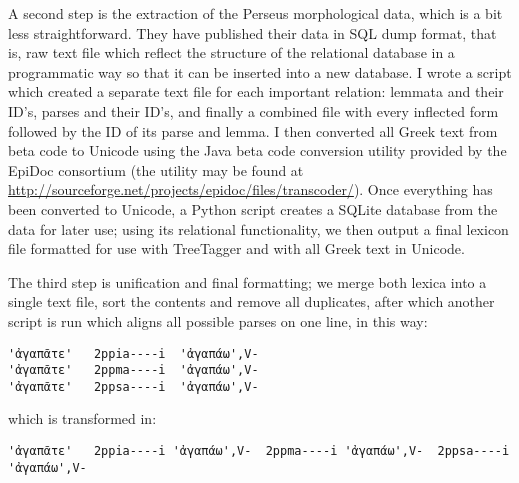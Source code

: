 A second step is the extraction of the Perseus morphological data, which is a
bit less straightforward. They have published their data in SQL dump format,
that is, raw text file which reflect the structure of the relational database
in a programmatic way so that it can be inserted into a new database. I wrote a
script which created a separate text file for each important relation: lemmata
and their ID's, parses and their ID's, and finally a combined file with every
inflected form followed by the ID of its parse and lemma. I then converted all
Greek text from beta code to Unicode using the Java beta code conversion
utility provided by the EpiDoc consortium (the utility may be found at
\url{http://sourceforge.net/projects/epidoc/files/transcoder/}). Once
everything has been converted to Unicode, a Python script creates a SQLite
database from the data for later use; using its relational functionality, we
then output a final lexicon file formatted for use with TreeTagger and with all
Greek text in Unicode.

The third step is unification and final formatting; we merge both lexica into a
single text file, sort the contents and remove all duplicates, after which
another script is run which aligns all possible parses on one line, in this
way:

\lstset{numbers=left,
  escapebegin=\Greek,
  escapeend=\Latin,
    numberstyle=\scriptsize,
    stepnumber=1,
    numbersep=8pt
}

\begin{lstlisting}[firstnumber=1, escapeinside='']
'ἀγαπᾶτε'	2ppia----i	'ἀγαπάω',V-
'ἀγαπᾶτε'	2ppma----i	'ἀγαπάω',V-
'ἀγαπᾶτε'	2ppsa----i	'ἀγαπάω',V-
\end{lstlisting}

which is transformed in:

\begin{lstlisting}[firstnumber=1, escapeinside='']
'ἀγαπᾶτε'	2ppia----i 'ἀγαπάω',V-	2ppma----i 'ἀγαπάω',V-	2ppsa----i 'ἀγαπάω',V-
\end{lstlisting}

